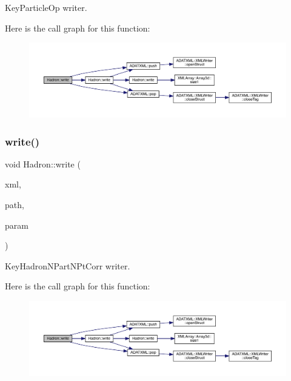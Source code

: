 Key\+Particle\+Op writer. 

Here is the call graph for this function\+:
\nopagebreak
\begin{figure}[H]
\begin{center}
\leavevmode
\includegraphics[width=350pt]{d1/daf/namespaceHadron_a1aaa6594011475e4142807cfbf0b78e9_cgraph}
\end{center}
\end{figure}
\mbox{\label{namespaceHadron_a295fddb7420012571f5b8115f2b25a97}} 
\subsubsection{\texorpdfstring{write()}{write()}\hspace{0.1cm}{\footnotesize\ttfamily [30/95]}}
{\footnotesize\ttfamily void Hadron\+::write (\begin{DoxyParamCaption}\item[{\mbox{\hyperlink{classADATXML_1_1XMLWriter}{X\+M\+L\+Writer}} \&}]{xml,  }\item[{const std\+::string \&}]{path,  }\item[{const \mbox{\hyperlink{structHadron_1_1KeyHadronNPartNPtCorr__t}{Key\+Hadron\+N\+Part\+N\+Pt\+Corr\+\_\+t}} \&}]{param }\end{DoxyParamCaption})}



Key\+Hadron\+N\+Part\+N\+Pt\+Corr writer. 

Here is the call graph for this function\+:
\nopagebreak
\begin{figure}[H]
\begin{center}
\leavevmode
\includegraphics[width=350pt]{d1/daf/namespaceHadron_a295fddb7420012571f5b8115f2b25a97_cgraph}
\end{center}
\end{figure}
\mbox{\label{namespaceHadron_a67dc2040c75fb33a942bc5a59243c4c3}} 
